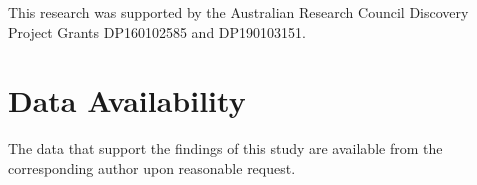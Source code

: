 \documentclass[aip,graphicx]{revtex4-1}
\begin{document}
\begin{acknowledgments}
	This research was supported by the Australian Research Council Discovery
	Project Grants DP160102585 and DP190103151.  
\end{acknowledgments}

\section*{Data Availability}
The data that support the findings of this study are available from the corresponding author upon reasonable request.

%
\end{document}
